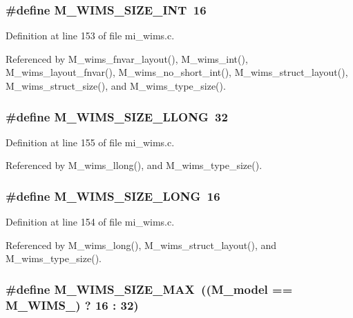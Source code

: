 \subsubsection{\setlength{\rightskip}{0pt plus 5cm}\#define M\_\-WIMS\_\-SIZE\_\-INT~16}\label{mi__wims_8c_b852654410a8ab2a76381ef7f816c963}




Definition at line 153 of file mi\_\-wims.c.

Referenced by M\_\-wims\_\-fnvar\_\-layout(), M\_\-wims\_\-int(), M\_\-wims\_\-layout\_\-fnvar(), M\_\-wims\_\-no\_\-short\_\-int(), M\_\-wims\_\-struct\_\-layout(), M\_\-wims\_\-struct\_\-size(), and M\_\-wims\_\-type\_\-size().
\subsubsection{\setlength{\rightskip}{0pt plus 5cm}\#define M\_\-WIMS\_\-SIZE\_\-LLONG~32}\label{mi__wims_8c_2f02c82d9f26ae5089fd5fd9e88f2f5a}




Definition at line 155 of file mi\_\-wims.c.

Referenced by M\_\-wims\_\-llong(), and M\_\-wims\_\-type\_\-size().
\subsubsection{\setlength{\rightskip}{0pt plus 5cm}\#define M\_\-WIMS\_\-SIZE\_\-LONG~16}\label{mi__wims_8c_9ac7dceccbec02abc96fdb80016851f1}




Definition at line 154 of file mi\_\-wims.c.

Referenced by M\_\-wims\_\-long(), M\_\-wims\_\-struct\_\-layout(), and M\_\-wims\_\-type\_\-size().
\subsubsection{\setlength{\rightskip}{0pt plus 5cm}\#define M\_\-WIMS\_\-SIZE\_\-MAX~((\bf{M\_\-model} == M\_\-WIMS\_) ? 16 : 32)}\label{mi__wims_8c_207f773b78fa96d0a558b02a804d968a}




